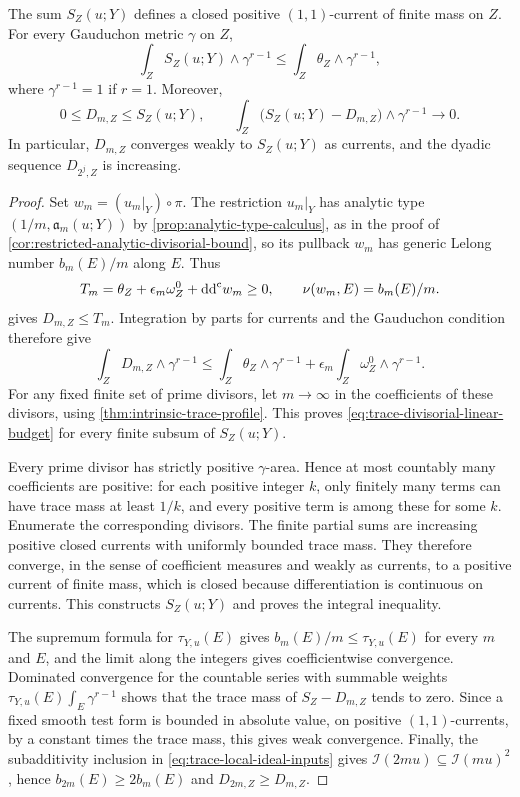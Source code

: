 \begin{theorem}\label{thm:trace-divisorial-current-budget}
The sum $S_Z(u;Y)$ defines a closed positive $(1,1)$-current of finite mass on $Z$. For every Gauduchon metric $\gamma$ on $Z$,
\begin{equation}\label{eq:trace-divisorial-linear-budget}
 \int_Z S_Z(u;Y)\wedge\gamma^{r-1}
 \leq\int_Z\theta_Z\wedge\gamma^{r-1},
\end{equation}
where $\gamma^{r-1}=1$ if $r=1$. Moreover,
\[
 0\leq D_{m,Z}\leq S_Z(u;Y),\qquad
 \int_Z\bigl(S_Z(u;Y)-D_{m,Z}\bigr)\wedge\gamma^{r-1}
 \longrightarrow0.
\]
In particular, $D_{m,Z}$ converges weakly to $S_Z(u;Y)$ as currents, and the dyadic sequence $D_{2^j,Z}$ is increasing.
\end{theorem}
\begin{proof}
Set $w_m=(u_m|_Y)\circ\pi$. The restriction $u_m|_Y$ has analytic type $(1/m,\mathfrak a_m(u;Y))$ by \cref{prop:analytic-type-calculus}, as in the proof of \cref{cor:restricted-analytic-divisorial-bound}, so its pullback $w_m$ has generic Lelong number $b_m(E)/m$ along $E$. Thus
\[
 T_m=\theta_Z+\epsilon_m\omega_Z^0+\mathrm{dd}^{\mathrm{c}} w_m\geq0,
 \qquad \nu(w_m,E)=b_m(E)/m.
\]
 gives $D_{m,Z}\leq T_m$. Integration by parts for currents and the Gauduchon condition therefore give
\[
 \int_ZD_{m,Z}\wedge\gamma^{r-1}
 \leq\int_Z\theta_Z\wedge\gamma^{r-1}
       +\epsilon_m\int_Z\omega_Z^0\wedge\gamma^{r-1}.
\]
For any fixed finite set of prime divisors, let $m\to\infty$ in the coefficients of these divisors, using \cref{thm:intrinsic-trace-profile}. This proves \eqref{eq:trace-divisorial-linear-budget} for every finite subsum of $S_Z(u;Y)$.

Every prime divisor has strictly positive $\gamma$-area. Hence at most countably many coefficients are positive: for each positive integer $k$, only finitely many terms can have trace mass at least $1/k$, and every positive term is among these for some $k$. Enumerate the corresponding divisors. The finite partial sums are increasing positive closed currents with uniformly bounded trace mass. They therefore converge, in the sense of coefficient measures and weakly as currents, to a positive current of finite mass, which is closed because differentiation is continuous on currents. This constructs $S_Z(u;Y)$ and proves the integral inequality.

The supremum formula for $\tau_{Y,u}(E)$ gives $b_m(E)/m\leq\tau_{Y,u}(E)$ for every $m$ and $E$, and the limit along the integers gives coefficientwise convergence. Dominated convergence for the countable series with summable weights $\tau_{Y,u}(E)\int_E\gamma^{r-1}$ shows that the trace mass of $S_Z-D_{m,Z}$ tends to zero. Since a fixed smooth test form is bounded in absolute value, on positive $(1,1)$-currents, by a constant times the trace mass, this gives weak convergence. Finally, the subadditivity inclusion in \eqref{eq:trace-local-ideal-inputs} gives $\mathcal I(2mu)\subseteq\mathcal I(mu)^2$, hence $b_{2m}(E)\geq2b_m(E)$ and $D_{2m,Z}\geq D_{m,Z}$.
\end{proof}

